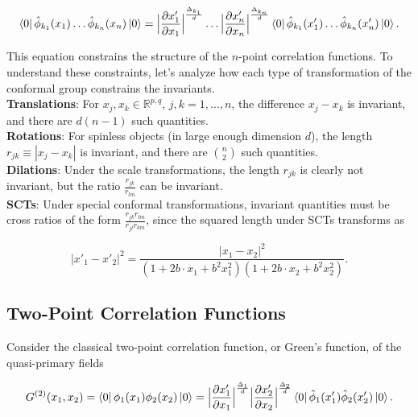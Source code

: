 \begin{equation}
\bra{0} \hat{\phi}_{k_1} (x_1) \dots \hat{\phi}_{k_n} (x_n) \ket{0} = \Big{|} \frac{\partial x_1'}{\partial x_1} \Big{|}^{\frac{\Delta_{k_1}}{d}} \dots \Big{|} \frac{\partial x_n'}{\partial x_n} \Big{|}^{\frac{\Delta_{k_n}}{d}} \bra{0} \hat{\phi}_{k_1} (x'_1) \dots \hat{\phi}_{k_n} (x'_n) \ket{0}.
\end{equation}

\noindent This equation constrains the structure of the $n$-point correlation functions. To understand these constraints, let's analyze how each type of transformation of the conformal group constrains the invariants. \\

\noindent \textbf{Translations}: For $x_j, x_k \in \mathbb{R}^{p,q}$, $j, k = 1, \dots, n$, the difference $x_j - x_k$ is invariant, and there are $d(n-1)$ such quantities. \\

\noindent \textbf{Rotations}: For spinless objects (in large enough dimension $d$), the length $r_{jk} \equiv |x_j - x_k |$ is invariant, and there are ${n \choose 2}$ such quantities. \\

\noindent \textbf{Dilations}: Under the scale transformations, the length $r_{jk}$ is clearly not invariant, but the ratio $\frac{r_{jk}}{r_{lm}}$ can be invariant. \\

\noindent \textbf{SCTs}: Under special conformal transformations, invariant quantities must be cross ratios of the form $\frac{r_{jk} r_{lm}}{r_{jl} r_{km}}$, since the squared length under SCTs transforms as

\begin{equation}
|x'_1 - x'_2 |^2 = \frac{|x_1 - x_2 |^2}{(1 + 2 b \cdot x_1 + b^2 x_1^2) (1 + 2 b \cdot x_2 + b^2 x_2^2)}.
\end{equation}

\subsection*{Two-Point Correlation Functions}

\noindent Consider the classical two-point correlation function, or Green's function, of the quasi-primary fields

\begin{equation}
G^{(2)} (x_1, x_2) = \bra{0} \phi_1 (x_1) \phi_2 (x_2) \ket{0} = \Big{|} \frac{\partial x_1'}{\partial x_1} \Big{|}^{\frac{\Delta_{1}}{d}} \Big{|} \frac{\partial x_2'}{\partial x_2} \Big{|}^{\frac{\Delta_{2}}{d}} \bra{0} \hat{\phi}_{1} (x'_1) \hat{\phi}_{2} (x'_2) \ket{0}.
\end{equation}

